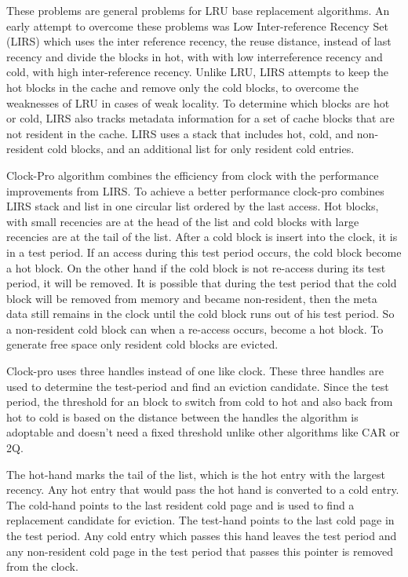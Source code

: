 \documentclass[
	12pt,
	a4paper,
	abstract,
	bibliography=totoc,
	chapterprefix,
	headings=openright,
	numbers=endperiod,
	parskip=half,
	twoside,
]{scrreprt}
\begin{document}
These problems are general problems for LRU base replacement algorithms.
An early attempt to overcome these problems was Low Inter-reference Recency Set (LIRS) \cite{10.1145/511399.511340} which uses the inter reference recency, the reuse distance, instead of last recency and divide the blocks in hot, with with low interreference recency and cold, with high inter-reference recency.
Unlike LRU, LIRS attempts to keep the hot blocks in the cache and remove only the cold blocks, to overcome the weaknesses of LRU in cases of weak locality.
To determine which blocks are hot or cold, LIRS also tracks metadata information for a set of cache blocks that are not resident in the cache.
LIRS uses a stack that includes hot, cold, and non-resident cold blocks, and an additional list for only resident cold entries.

Clock-Pro algorithm \cite{jiang2005clock} combines the efficiency from clock with the performance improvements from LIRS.
To achieve a better performance clock-pro combines LIRS stack and list in one circular list ordered by the last access.
Hot blocks, with small recencies are at the head of the list and cold blocks with large recencies are at the tail of the list.
After a cold block is insert into the clock, it is in a test period.
If an access during this test period occurs, the cold block become a hot block.
On the other hand if the cold block is not re-access during its test period, it will be removed.
It is possible that during the test period that the cold block will be removed from memory and became non-resident, then the meta data still remains in the clock until the cold block runs out of his test period.
So a non-resident cold block can when a re-access occurs, become a hot block.
To generate free space only resident cold blocks are evicted.

Clock-pro uses three handles instead of one like clock.
These three handles are used to determine the test-period and find an eviction candidate.
Since the test period, the threshold for an block to switch from cold to hot and also back from hot to cold is based on the distance between the handles the algorithm is adoptable and doesn't need a fixed threshold unlike other algorithms like CAR or 2Q.


The hot-hand marks the tail of the list, which is the hot entry with the largest recency.
Any hot entry that would pass the hot hand is converted to a cold entry.
The cold-hand points to the last resident cold page and is used to find a replacement candidate for eviction.
The test-hand points to the last cold page in the test period. Any cold entry which passes this hand leaves the test period and any non-resident cold page in the test period that passes this pointer is removed from the clock.
\end{document}

